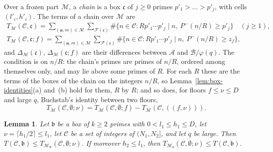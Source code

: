 \documentclass[11pt]{article}
\newtheorem{lemma}[theorem]{Lemma}
\theoremstyle{definition}
\begin{document}
Over a frozen part $\mathcal M$, a \emph{chain} is a box $\mathfrak c$ of $j \ge 0$ primes $p'_1 > \dots > p'_j$, with
cells $(l'_i, h'_i)$. The terms of a chain over $\mathcal M$ are
\begin{gather*}
  T_{\mathcal M}(\mathcal C, \mathfrak c) = \sum_{(\mathbf a, m) \in \mathcal M} \sum_{\mathcal F(\mathfrak c)}
  \#\{n \in \mathcal C : R p'_1 \cdots p'_j \mid n,\ P^-(n/R) \ge p'_j\} \quad (j \ge 1), \\
  T_{\mathcal M}(\mathcal C, \mathfrak c; f) = \sum_{(\mathbf a, m) \in \mathcal M} \sum_{\mathcal F(\mathfrak c)}
  \#\{n \in \mathcal C : R p'_1 \cdots p'_j \mid n,\ P^-(n/R) \ge z_f\},
\end{gather*}
and $\Delta_{\mathcal M}(\mathfrak c)$, $\Delta_{\mathcal M}(\mathfrak c; f)$ are their differences between $\mathcal A$
and $\mathcal B/\varphi(q)$. The condition is on $n/R$: the chain's primes are primes of $n/R$, ordered among themselves
only, and may lie above some primes of $R$. For each $R$ these are the terms of the boxes of the chain on the integers
$n/R$, so Lemma~\ref{lem:box-identities}(a) and~(b) hold for them, $R$ by $R$; and so does, for floors $f \le \nu \le
D$ and large $q$, Buchstab's identity between two floors,
\begin{equation}\label{eq:levels}
  T_{\mathcal M}(\mathcal C, \emptyset; \nu) = T_{\mathcal M}(\mathcal C, \emptyset; f) - T_{\mathcal M}(\mathcal C,
  ((f, \nu))).
\end{equation}

\begin{lemma}\label{lem:sandwich}
Let $\mathfrak b$ be a box of $k \ge 2$ primes with $0 < l_1 \le h_1 \le D$, let $\nu = \lceil h_1/2 \rceil \le l_1$,
let $\mathcal C$ be a set of integers of $(N_1, N_2]$, and let $q$ be large. Then $T(\mathcal C, \mathfrak b) \le
T_{\mathcal M_{\mathrm w}}(\mathcal C, \emptyset; \nu)$. If moreover $h_2
\le l_1$, then $T_{\mathcal M_{\mathrm n}}(\mathcal C, \emptyset; \nu) \le T(\mathcal C, \mathfrak b)$.
\end{lemma}
\end{document}
